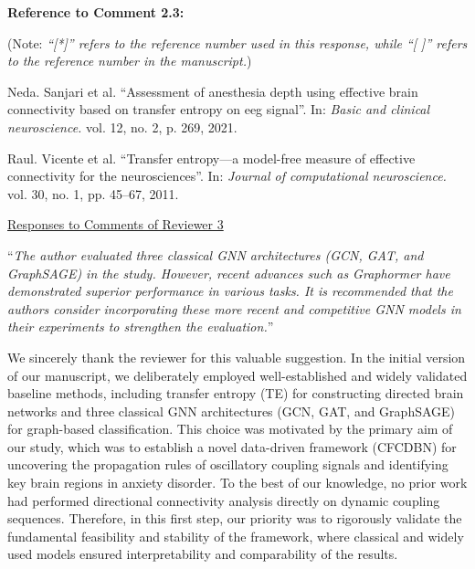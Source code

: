 \documentclass[12pt,technote,onecolumn]{IEEEtran}
\begin{document}
\vspace{1mm}

\noindent \textbf{Reference to Comment 2.3:} 

\noindent(Note: \textit{``[*]'' refers to the reference number used in this response, while ``[ ]'' refers to the reference number in the manuscript.})

\noindent[*1]\:Neda. Sanjari et al. ``Assessment of anesthesia depth using effective brain connectivity based on transfer
entropy on eeg signal”. In: \textit{Basic and clinical neuroscience.} vol. 12, no. 2, p. 269, 2021.

\noindent[*2]\:Raul. Vicente et al. ``Transfer entropy—a model-free measure of effective connectivity for the
neurosciences”. In: \textit{Journal of computational neuroscience.} vol. 30, no. 1, pp. 45–67, 2011.



\newpage
\clearpage
\begin{center}
\underline{Responses to Comments of Reviewer 3}
\end{center}

\vspace{4mm} %
 ``{\it The author evaluated three classical GNN architectures (GCN, GAT, and GraphSAGE) in the study. However, recent advances such as Graphormer have demonstrated superior performance in various tasks. It is recommended that the authors consider incorporating these more recent and competitive GNN models in their experiments to strengthen the evaluation.}''
\vspace{1mm}  %


We sincerely thank the reviewer for this valuable suggestion. In the initial version of our manuscript, we deliberately employed well-established and widely validated baseline methods, including transfer entropy (TE) for constructing directed brain networks and three classical GNN architectures (GCN, GAT, and GraphSAGE) for graph-based classification. This choice was motivated by the primary aim of our study, which was to establish a novel data-driven framework (CFCDBN) for uncovering the propagation rules of oscillatory coupling signals and identifying key brain regions in anxiety disorder. To the best of our knowledge, no prior work had performed directional connectivity analysis directly on dynamic coupling sequences. Therefore, in this first step, our priority was to rigorously validate the fundamental feasibility and stability of the framework, where classical and widely used models ensured interpretability and comparability of the results.
\end{document}
